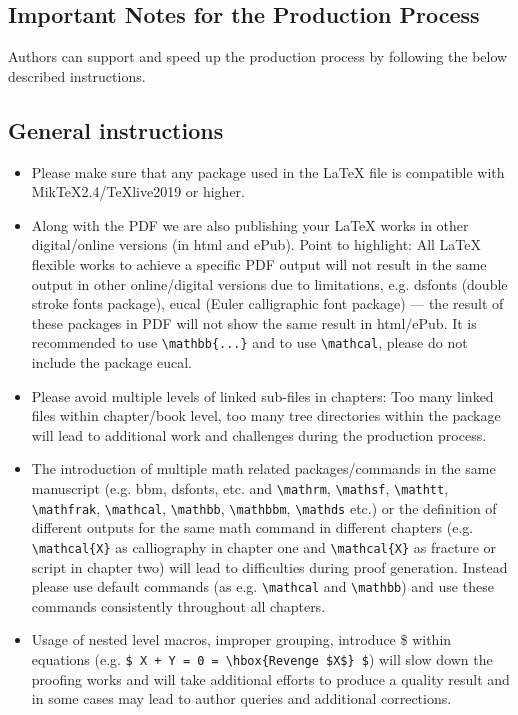 \documentclass[graybox]{svmono}
\begin{document}
\begin{sloppy}
\section{Important Notes for the Production Process}

Authors can support and speed up the production process by following the below described instructions.

\subsection*{General instructions}

\begin{itemize}
\item Please make sure that any package used in the LaTeX file is compatible with MikTeX2.4/TeXlive2019 or higher.

\item Along with the PDF we are also publishing your LaTeX works in other digital/online versions (in html and ePub). Point to highlight: All LaTeX flexible works to achieve a specific PDF output will not result in the same output in other online/digital versions due to limitations, e.g. dsfonts (double stroke fonts package), eucal (Euler calligraphic font package) --- the result of these packages in PDF will not show the same result in html/ePub. It is recommended to use \verb|\mathbb{...}| and to use \verb|\mathcal|, please do not include the package eucal.

\item Please avoid multiple levels of linked sub-files in chapters: Too many linked files within chapter/book level, too many tree directories within the package will lead to additional work and challenges during the production process.

\item The introduction of multiple math related packages/commands in the same manuscript (e.g. bbm, dsfonts, etc. and \verb|\mathrm|, \verb|\mathsf|, \verb|\mathtt|, \verb|\mathfrak|, \verb|\mathcal|, \verb|\mathbb|, \verb|\mathbbm|, \verb|\mathds| etc.) or the definition of different outputs for the same math command in different chapters (e.g. \verb|\mathcal{X}| as calliography in chapter one and \verb|\mathcal{X}| as fracture or script in chapter two) will lead to difficulties during proof generation. Instead please use default commands (as e.g. \verb|\mathcal| and \verb|\mathbb|) and use these commands consistently throughout all chapters.

\item Usage of nested level macros, improper grouping, introduce \$ within equations (e.g. \verb|$ X + Y = 0 = \hbox{Revenge $X$} $|) will slow down the proofing works and will take additional efforts to produce a quality result and in some cases may lead to author queries and additional corrections.


\end{itemize}
\end{sloppy}
\end{document}

